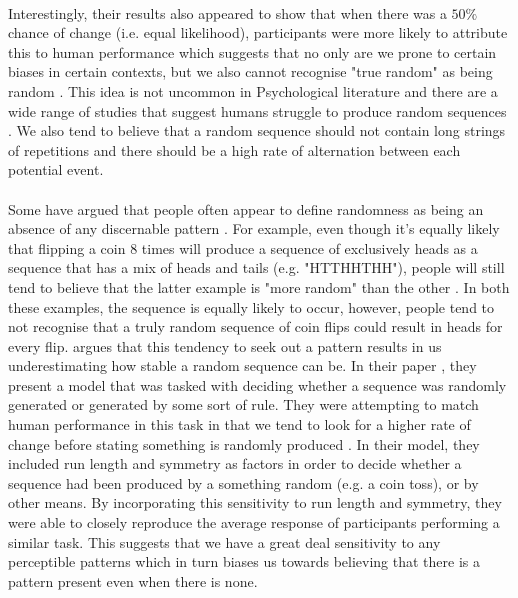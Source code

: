 \documentclass[12pt]{article}
\begin{document}
\paragraph{} Interestingly, their results also appeared to show that when there was a $50\%$ chance of change (i.e. equal likelihood), participants were more likely to attribute this to human performance which suggests that no only are we prone to certain biases in certain contexts, but we also cannot recognise "true random" as being random \cite{Ayton2004}. This idea is not uncommon in Psychological literature and there are a wide range of studies that suggest humans struggle to produce random sequences \citep[see][for a review]{BARHILLEL1991428}. We also tend to believe that a random sequence should not contain long strings of repetitions and there should be a high rate of alternation between each potential event. 

\paragraph{} Some have argued that people often appear to define randomness as being an absence of any discernable pattern \citep{lopes1987distinguishing}. For example, even though it's equally likely that flipping a coin 8 times will produce a sequence of exclusively heads as a sequence that has a mix of heads and tails (e.g. "HTTHHTHH"), people will still tend to believe that the latter example is "more random" than the other \citep{KAHNEMAN1972430}. In both these examples, the sequence is equally likely to occur, however, people tend to not recognise that a truly random sequence of coin flips could result in heads for every flip. \cite{GRIFFITHS201885} argues that this tendency to seek out a pattern results in us underestimating how stable a random sequence can be. In their paper \citep{GRIFFITHS201885}, they present a model that was tasked with deciding whether a sequence was randomly generated or generated by some sort of rule. They were attempting to match human performance in this task in that we tend to look for a higher rate of change before stating something is randomly produced \citep{Ayton2004}. In their model, they included run length and symmetry as factors in order to decide whether a sequence had been produced by a something random (e.g. a coin toss), or by other means. By incorporating this sensitivity to run length and symmetry, they were able to closely reproduce the average response of participants performing a similar task. This suggests that we have a great deal sensitivity to any perceptible patterns which in turn biases us towards believing that there is a pattern present even when there is none. 
\end{document}
